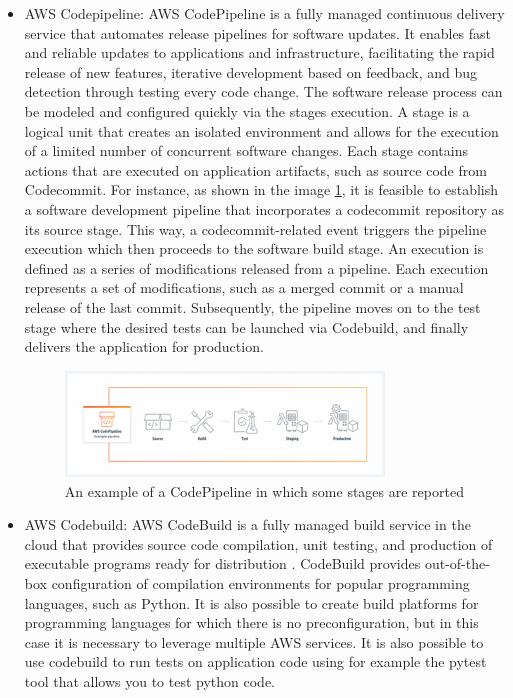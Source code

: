 \begin{itemize}
    \item AWS Codepipeline: AWS CodePipeline is a fully managed continuous delivery service that automates release pipelines for software updates. It enables fast and reliable updates to applications and infrastructure, facilitating the rapid release of new features, iterative development based on feedback, and bug detection through testing every code change. The software release process can be modeled and configured quickly via the stages execution. A stage is a logical unit that creates an isolated environment and allows for the execution of a limited number of concurrent software changes. Each stage contains actions that are executed on application artifacts, such as source code from Codecommit. For instance, as shown in the image \ref{fig:AWSCodepipeline}, it is feasible to establish a software development pipeline that incorporates a codecommit repository as its source stage. This way, a codecommit-related event triggers the pipeline execution which then proceeds to the software build stage. An execution is defined as a series of modifications released from a pipeline.   Each execution represents a set of modifications, such as a merged commit or a manual release of the last commit. Subsequently, the pipeline moves on to the test stage where the desired tests can be launched via Codebuild, and finally delivers the application for production. 
    \begin{figure}[h]  %
        \centering
        \includegraphics[width=0.8\textwidth]{images/AWSCodepipeline.png}  %
        \caption{An example of a CodePipeline in which some stages are reported \cite{AWSCodepipeline}}
        \label{fig:AWSCodepipeline}
    \end{figure}
    \item AWS Codebuild: AWS CodeBuild is a fully managed build service in the cloud that provides source code compilation, unit testing, and production of executable programs ready for distribution \cite{AWSCodebuild}. CodeBuild provides out-of-the-box configuration of compilation environments for popular programming languages, such as Python. It is also possible to create build platforms for programming languages for which there is no preconfiguration, but in this case it is necessary to leverage multiple AWS services. It is also possible to use codebuild to run tests on application code using for example the pytest tool that allows you to test python code.

\end{itemize}
